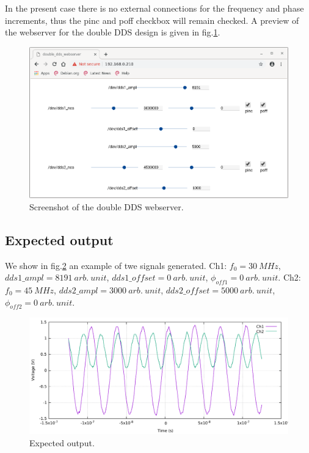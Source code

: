 \documentclass[12pt,oneside]{article}
\begin{document}
In the present case there is no external connections for the frequency and phase increments, thus the pinc and poff checkbox will remain checked. A preview of the webserver for the double DDS design is given in fig.\ref{fig:webdoubleDDS}.

\begin{figure}[!h!tb]
	\begin{center}
		\includegraphics[width=14cm]{webserver/2019-10-14-143651_927x541_scrot.png}
		\caption{Screenshot of the double DDS webserver.}
		\label{fig:webdoubleDDS}
	\end{center}
\end{figure}

\vspace{0cm}

\subsection{Expected output}

We show in fig.\ref{fig:doubleDDSok} an example of twe signals generated. \newline 
Ch1: $f_0=30~MHz$, $dds1\_ampl=8191~arb.~unit$, $dds1\_offset=0~arb.~unit$, \newline $\phi_{off1}=0~arb.~unit$.\newline
Ch2: $f_0=45~MHz$, $dds2\_ampl=3000~arb.~unit$, $dds2\_offset=5000~arb.~unit$, \newline $\phi_{off2}=0~arb.~unit$.

\begin{figure}[h!tb]
	\begin{center}
		\includegraphics[width=14cm]{scope/doubleDDSok.pdf}
		\caption{Expected output.}
		\label{fig:doubleDDSok}
	\end{center}
\end{figure}
\end{document}
